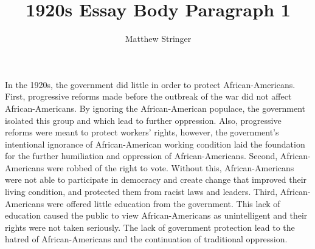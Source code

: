 \documentclass[14pt]{extarticle}
\title{1920s Essay Body Paragraph 1}
\author{Matthew Stringer}
\begin{document}
    \maketitle
    In the 1920s, the government did little in order to protect African-Americans.
% 
    First, progressive reforms made before the outbreak of the war did not affect 
    African-Americans. By ignoring the African-American populace, the government 
    isolated this group and which lead to further oppression. Also, progressive
    reforms were meant to protect workers' rights, however, the government's 
    intentional ignorance of African-American working condition laid the foundation
    for the further humiliation and oppression of African-Americans.
% 
    Second, African-Americans were robbed of the right to vote.
    Without this, African-Americans were not able to participate in democracy and 
    create change that improved their living condition, and protected them from racist
    laws and leaders.
% 
    Third, African-Americans were offered little education from the government.
    This lack of education caused the public to view African-Americans as unintelligent 
    and their rights were not taken seriously.
% 
    The lack of government protection lead to the hatred of African-Americans and 
    the continuation of traditional oppression.
\end{document}
